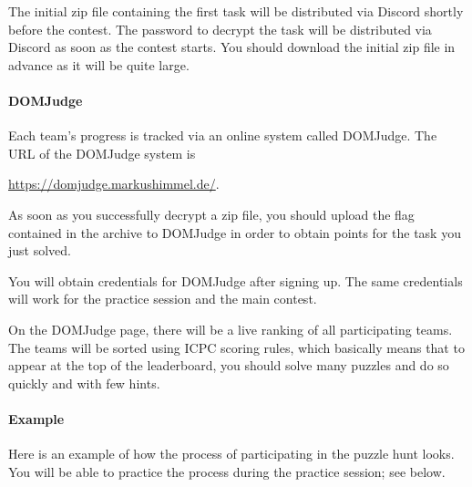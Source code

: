 \documentclass[fontsize=10pt,a4paper,DIV=12,parskip=half]{scrarticle}
\begin{document}
The initial zip file containing the first task will be distributed via Discord
shortly before the contest. The password to decrypt the task will be
distributed via Discord as soon as the contest starts. You should download the
initial zip file in advance as it will be quite large.

\paragraph{DOMJudge}
Each team's progress is tracked via an online system called DOMJudge. The URL of
the DOMJudge system is
\begin{center}
	\url{https://domjudge.markushimmel.de/}.
\end{center}

As soon as you successfully decrypt a zip file, you should upload the flag
contained in the archive to DOMJudge in order to obtain points for the task you
just solved.

You will obtain credentials for DOMJudge after signing up. The same credentials
will work for the practice session and the main contest.

On the DOMJudge page, there will be a live ranking of all participating teams.
The teams will be sorted using ICPC scoring rules, which basically means that
to appear at the top of the leaderboard, you should solve many puzzles and do
so quickly and with few hints.

\paragraph{Example}
Here is an example of how the process of participating in the puzzle hunt looks.
You will be able to practice the process during the practice session; see below.
\end{document}
